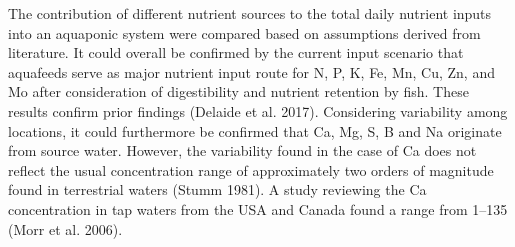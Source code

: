 \documentclass[preprint, 3p,
authoryear]{elsarticle} %
\begin{document}
The contribution of different nutrient sources to the total daily
nutrient inputs into an aquaponic system were compared based on
assumptions derived from literature. It could overall be confirmed by
the current input scenario that aquafeeds serve as major nutrient input
route for N, P, K, Fe, Mn, Cu, Zn, and Mo after consideration of
digestibility and nutrient retention by fish. These results confirm
prior findings (Delaide et al. 2017). Considering variability among
locations, it could furthermore be confirmed that Ca, Mg, S, B and Na
originate from source water. However, the variability found in the case
of Ca does not reflect the usual concentration range of approximately
two orders of magnitude found in terrestrial waters (Stumm 1981). A
study reviewing the Ca concentration in tap waters from the USA and
Canada found a range from \SIrange{1}{135}{\mgL} (Morr et al. 2006).
\end{document}
